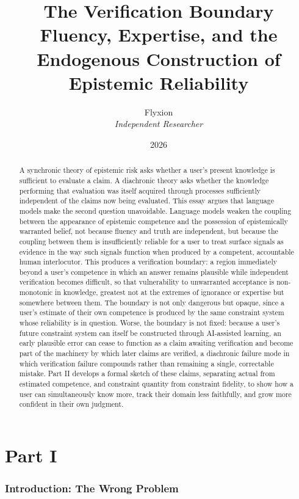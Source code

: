\documentclass[11pt]{article}
\title{\textbf{The Verification Boundary}\\[0.3em]
\large Fluency, Expertise, and the Endogenous Construction of Epistemic Reliability}
\author{Flyxion \\ \textit{Independent Researcher}}
\date{2026}
\begin{document}
\maketitle

\begin{abstract}
A synchronic theory of epistemic risk asks whether a user's present knowledge is sufficient to evaluate a claim. A diachronic theory asks whether the knowledge performing that evaluation was itself acquired through processes sufficiently independent of the claims now being evaluated. This essay argues that language models make the second question unavoidable. Language models weaken the coupling between the appearance of epistemic competence and the possession of epistemically warranted belief, not because fluency and truth are independent, but because the coupling between them is insufficiently reliable for a user to treat surface signals as evidence in the way such signals function when produced by a competent, accountable human interlocutor. This produces a verification boundary: a region immediately beyond a user's competence in which an answer remains plausible while independent verification becomes difficult, so that vulnerability to unwarranted acceptance is non-monotonic in knowledge, greatest not at the extremes of ignorance or expertise but somewhere between them. The boundary is not only dangerous but opaque, since a user's estimate of their own competence is produced by the same constraint system whose reliability is in question. Worse, the boundary is not fixed: because a user's future constraint system can itself be constructed through AI-assisted learning, an early plausible error can cease to function as a claim awaiting verification and become part of the machinery by which later claims are verified, a diachronic failure mode in which verification failure compounds rather than remaining a single, correctable mistake. Part II develops a formal sketch of these claims, separating actual from estimated competence, and constraint quantity from constraint fidelity, to show how a user can simultaneously know more, track their domain less faithfully, and grow more confident in their own judgment.
\end{abstract}

\part*{Part I}

\section{Introduction: The Wrong Problem}
\end{document}
